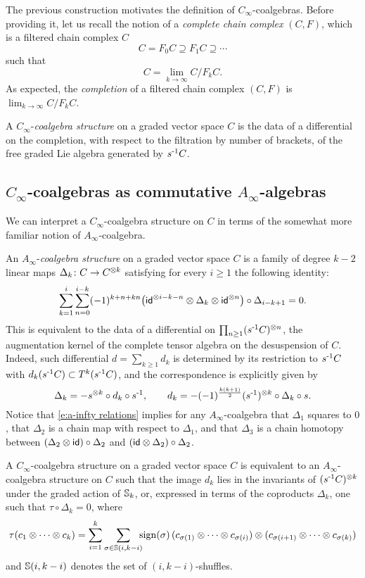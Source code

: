 The previous construction motivates the definition of $C_\infty$-coalgebras.
Before providing it, let us recall the notion of a \textit{complete chain complex} $(C, F)$, which is a filtered chain complex $C$
\[
C = F_0 C \supseteq F_1 C \supseteq \cdots
\]
such that
\[
C = \lim_{k\to \infty} C / F_k C.
\]
As expected, the \textit{completion} of a filtered chain complex $(C, F)$ is $\lim_{k\to \infty} C / F_k C$.

A $C_\infty$-\textit{coalgebra structure} on a graded vector space $C$ is the data of a differential on the completion, with respect to the filtration by number of brackets, of the free graded Lie algebra generated by $s^{\mbox{\scriptsize -1}}C$.

\subsection{$C_\infty$-coalgebras as commutative $A_\infty$-algebras} \label{ss:a-infty coalgebras}

We can interpret a $C_\infty$-coalgebra structure on $C$ in terms of the somewhat more familiar notion of $A_\infty$-coalgebra.

An $A_\infty$-\textit{coalgebra structure} on a graded vector space $C$ is a family of degree $k-2$ linear maps $\Delta_k \colon C \to C^{\otimes k}$ satisfying for every $i \geq 1$ the following identity:
\begin{equation} \label{e:a-infty relations}
\sum_{k=1}^{i} \sum_{n=0}^{i-k} (-1)^{k+n+kn} \big( \mathsf{id}^{\otimes i-k-n} \otimes \Delta_k \otimes \mathsf{id}^{\otimes n} \big) \circ \Delta_{i-k+1} = 0.
\end{equation}
This is equivalent to the data of a differential on $\prod_{n \geq 1} (s^{\mbox{\scriptsize -1}} C)^{\otimes n}$, the augmentation kernel of the complete tensor algebra on the desuspension of $C$.
Indeed, such differential $d = \sum_{k \geq 1} d_k$ is determined by its restriction to $s^{\mbox{\scriptsize -1}} C$ with $d_k(s^{\mbox{\scriptsize -1}} C) \subset T^k(s^{\mbox{\scriptsize -1}} C)$, and the correspondence is explicitly given by
\[
\Delta_k = - s^{\otimes k} \circ d_k \circ s^{\mbox{\scriptsize -1}},
\qquad
d_k = -(-1)^{\frac{k(k+1)}{2}} (s^{\mbox{\scriptsize -1}})^{\otimes k} \circ \Delta_k \circ s.
\]
Notice that \eqref{e:a-infty relations} implies for any $A_\infty$-coalgebra that $\Delta_1$ squares to $0$, that $\Delta_2$ is a chain map with respect to $\Delta_1$, and that $\Delta_3$ is a chain homotopy between $(\Delta_2 \otimes \mathsf{id}) \circ \Delta_2$ and $(\mathsf{id} \otimes \Delta_2) \circ \Delta_2$.

A $C_\infty$-coalgebra structure on a graded vector space $C$ is equivalent to an $A_\infty$-coalgebra structure on $C$ such that the image $d_k$ lies in the invariants of $(s^{\mbox{\scriptsize -1}} C)^{\otimes k}$ under the graded action of $\mathbb{S}_k$, or, expressed in terms of the coproducts $\Delta_k$, one such that $\tau \circ \Delta_k = 0$, where
\[
\tau(c_1 \otimes \dotsb \otimes c_k) =
\sum_{i=1}^{k} \sum_{\sigma \in \mathbb{S}(i, k-i)}
\!\!\! \operatorname{sign}(\sigma) \,
(c_{\sigma(1)} \otimes \dotsb \otimes c_{\sigma(i)}) \otimes
(c_{\sigma(i+1)} \otimes \dotsb \otimes c_{\sigma(k)})
\]
and $\mathbb{S}(i, k-i)$ denotes the set of $(i, k-i)$-shuffles.

